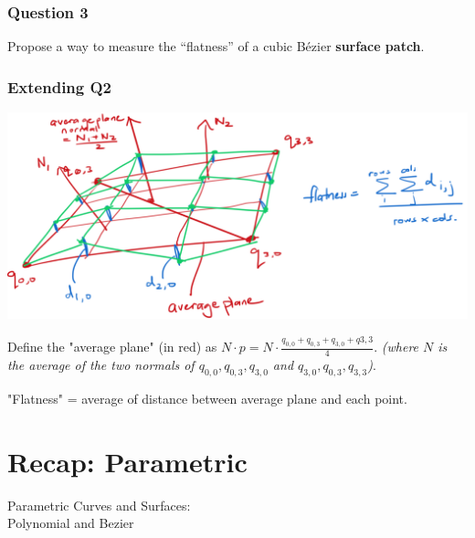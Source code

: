 \documentclass{beamer}
\begin{document}
\begin{frame}
    \frametitle{Question 3}
    Propose a way to measure the “flatness” of a cubic Bézier \textbf{surface patch}.
\end{frame}

\begin{frame}
    \frametitle{Extending Q2}

    \begin{center}
        \includegraphics[scale=0.3]{q3.png}
    \end{center}

    Define the "average plane" (in red) as $N \cdot p = N \cdot \frac{q_{0,0} + q_{0,3} + q_{3,0} + q{3,3}}{4}$.
    \textit{(where $N$ is the average of the two normals of $q_{0,0}, q_{0,3}, q_{3,0}$ and $q_{3,0}, q_{0,3}, q_{3,3}$)}.
    
    \vspace{1em}
    \begin{tcolorbox}
        "Flatness" = average of distance between average plane and each point.
    \end{tcolorbox}

\end{frame}

\iffalse
\section{Recap: Parametric}

\begin{frame}
    \AlegreyaExtraBold \LARGE
    Parametric Curves and Surfaces:\\
    Polynomial and Bezier
\end{frame}
\end{document}
